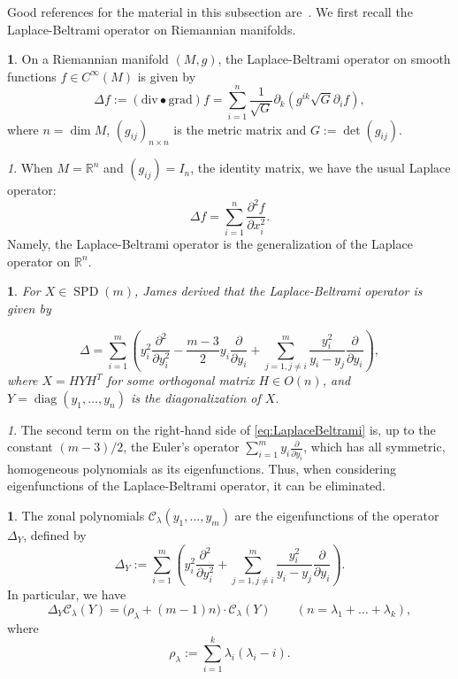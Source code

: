 \documentclass{mathincs}
\numberwithin{equation}{section}
\numberwithin{figure}{section}
\theoremstyle{plain}
\theoremstyle{definition}
\newtheorem{defn}[thm]{\protect\definitionname}
\theoremstyle{remark}
\newtheorem{rem}[thm]{\protect\remarkname}
\theoremstyle{plain}
\newtheorem{prop}[thm]{\protect\propositionname}
\theoremstyle{definition}
\theoremstyle{plain}
\theoremstyle{plain}
\DeclareMathOperator{\diag}{diag}
\newcommand{\SPD}{\operatorname{SPD}}
\providecommand{\definitionname}{Definition}
\providecommand{\propositionname}{Proposition}
\providecommand{\remarkname}{Remark}
\begin{document}
Good references for the material in this subsection are~\cite{Helgason,James1,Moakher}.
We first recall the Laplace-Beltrami operator on Riemannian manifolds.
\begin{defn}
On a Riemannian manifold $\left(M,g\right)$, the Laplace-Beltrami
operator on smooth functions $f\in C^{\infty}(M)$ is given by 
\[
\Delta f:=\left(\mathrm{div}\bullet\mathrm{grad}\right)f=\sum_{i=1}^{n}\frac{1}{\sqrt{G}}\partial_{k}\left(g^{ik}\sqrt{G}\partial_{i}f\right),
\]
where $n=\dim M$, $\left(g_{ij}\right)_{n\times n}$ is the metric
matrix and $G:=\det\left(g_{ij}\right)$. 
\end{defn}
\begin{rem}
When $M=\mathbb{R}^{n}$ and $\left(g_{ij}\right)=I_{n}$, the identity
matrix, we have the usual Laplace operator:
\[
\Delta f=\sum_{i=1}^{n}\frac{\partial^{2}f}{\partial x_{i}^{2}}.
\]
Namely, the Laplace-Beltrami operator is the generalization of the Laplace
operator on $\mathbb{R}^{n}$. 
\end{rem}
\begin{prop}
For $X\in \SPD(m)$, James \cite[eq.~3.12, p.~1712]{James1} derived
that the Laplace-Beltrami operator is given by

\begin{equation}
\Delta=\sum_{i=1}^{m}\left(y_{i}^{2}\frac{\partial^{2}}{\partial y_{i}^{2}}-\frac{m-3}{2}y_{i}\frac{\partial}{\partial y_{i}}+\sum_{j=1,j\neq i}^{m}\frac{y_{i}^{2}}{y_{i}-y_{j}}\frac{\partial}{\partial y_{i}}\right), \label{eq:LaplaceBeltrami}
\end{equation}
where $X=HYH^{T}$ for some orthogonal matrix $H\in O(n)$, and $Y=\diag(y_{1},\ldots,y_{n})$ is the diagonalization of $X$. 
\end{prop}
\begin{rem}
The second term on the right-hand side of \eqref{eq:LaplaceBeltrami} is, up to the constant $(m-3)/2$,
the Euler's operator $\sum_{i=1}^{m}y_{i}\frac{\partial}{\partial y_{i}}$,
which has all symmetric, homogeneous polynomials as its eigenfunctions.
Thus, when considering eigenfunctions of the Laplace-Beltrami operator,
it can be eliminated.
\end{rem}
\begin{defn}
The zonal polynomials $\mathcal{C}_{\lambda}(y_{1},\ldots,y_{m})$
are the eigenfunctions of the operator $\Delta_{Y}$, defined by
\[
  \Delta_{Y}:=\sum_{i=1}^{m}\left(y_{i}^{2}\frac{\partial^{2}}{\partial y_{i}^{2}}+\sum_{j=1,j\neq i}^{m}\frac{y_{i}^{2}}{y_{i}-y_{j}}\frac{\partial}{\partial y_{i}}\right).
\]
In particular, we have
\[
  \Delta_{Y}\mathcal{C}_{\lambda}(Y)=\bigl(\rho_{\lambda}+(m-1)n\bigr)\cdot\mathcal{C}_{\lambda}(Y)
  \qquad (n=\lambda_1+\dots+\lambda_k),
\]
where
\begin{equation}\label{eq:RHO}
  \rho_{\lambda}:=\sum_{i=1}^{k}\lambda_{i}\left(\lambda_{i}-i\right).
\end{equation}
\end{defn}
\end{document}
